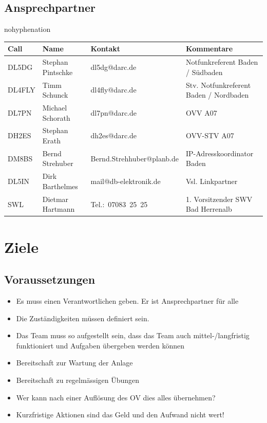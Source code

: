 \documentclass[a4paper]{scrartcl}
\begin{document}
\clearpage
\subsection{Ansprechpartner}
\begin{sloppypar}
\begin{hyphenrules}{nohyphenation}
\begin{longtabu} to \linewidth {llXX}
Call & Name & Kontakt & Kommentare\\
\toprule
\endhead
DL5DG   & Stephan Pintschke     & dl5dg@darc.de             & Notfunkreferent Baden / S\"udbaden \\
\midrule
DL4FLY  & Timm Schunck          & dl4fly@darc.de            & Stv. Notfunkreferent Baden / Nordbaden \\
\midrule
DL7PN   & Michael Schorath      & dl7pn@darc.de             & OVV A07 \\
\midrule
DH2ES   & Stephan Erath         & dh2es@darc.de             & OVV-STV A07 \\
\midrule
DM8BS   & Bernd Strehuber       & Bernd.Strehhuber@planb.de & IP-Adresskoordinator Baden \\
\midrule
DL5IN   & Dirk Barthelmes       & mail@db-elektronik.de     & Vsl. Linkpartner \\
\midrule
SWL     & Dietmar Hartmann      & Tel.:~07083~25~25         & 1. Vorsitzender SWV Bad Herrenalb \\
\bottomrule
\end{longtabu}
\end{hyphenrules}
\end{sloppypar}


\section{Ziele}
\subsection{Voraussetzungen}
\begin{itemize}
    \item Es muss einen Verantwortlichen geben. Er ist Ansprechpartner f\"ur alle
    \item Die Zust\"andigkeiten m\"ussen definiert sein.
    \item Das Team muss so aufgestellt sein, dass das Team auch mittel-/langfristig funktioniert und Aufgaben \"ubergeben werden k\"onnen
    \item Bereitschaft zur Wartung der Anlage
    \item Bereitschaft zu regelm\"assigen \"Ubungen
    \item Wer kann nach einer Aufl\"osung des OV dies alles \"ubernehmen?
    \item Kurzfristige Aktionen sind das Geld und den Aufwand nicht wert!
\end{itemize}
\end{document}
